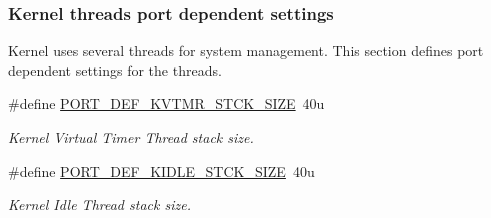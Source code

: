 \subsubsection*{Kernel threads port dependent settings}
\label{_amgrp0e6f87e4f5cc0437b98e154b3e410859}%
Kernel uses several threads for system management. This section defines port dependent settings for the threads. \begin{DoxyCompactItemize}
\item 
\#define \hyperlink{group__template__cpu__intf_gabaa296d76c28043a60531ad8ed81504b}{P\-O\-R\-T\-\_\-\-D\-E\-F\-\_\-\-K\-V\-T\-M\-R\-\_\-\-S\-T\-C\-K\-\_\-\-S\-I\-Z\-E}~40u
\begin{DoxyCompactList}\small\item\em Kernel Virtual Timer Thread stack size. \end{DoxyCompactList}\item 
\#define \hyperlink{group__template__cpu__intf_ga31d47ffb78c3755575e66821b3a72a62}{P\-O\-R\-T\-\_\-\-D\-E\-F\-\_\-\-K\-I\-D\-L\-E\-\_\-\-S\-T\-C\-K\-\_\-\-S\-I\-Z\-E}~40u
\begin{DoxyCompactList}\small\item\em Kernel Idle Thread stack size. \end{DoxyCompactList}\end{DoxyCompactItemize}
